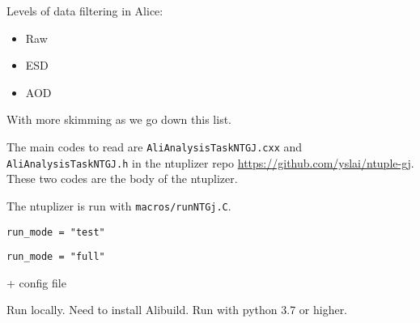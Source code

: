 \documentclass[12pt]{article}
\begin{document}
Levels of data filtering in Alice:

\begin{itemize}
\item Raw
\item ESD
\item AOD
\end{itemize}

With more skimming as we go down this list.

The main codes to read are \verb|AliAnalysisTaskNTGJ.cxx| and \verb|AliAnalysisTaskNTGJ.h| in the ntuplizer repo \href{https://github.com/yslai/ntuple-gj}{https://github.com/yslai/ntuple-gj}.
These two codes are the body of the ntuplizer.

The ntuplizer is run with \verb|macros/runNTGj.C|.

\verb|run_mode = "test"|

\verb|run_mode = "full"|

+ config file

Run locally.
Need to install Alibuild.
Run with python 3.7 or higher.


%
%
\end{document}
